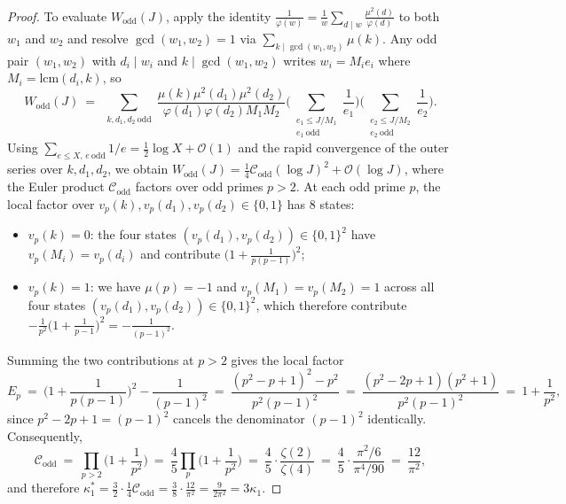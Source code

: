 \documentclass[11pt, a4paper]{article}
\theoremstyle{plain}
\theoremstyle{definition}
\begin{document}
\begin{proof}
To evaluate $W_{\mathrm{odd}}(J)$, apply the identity $\frac{1}{\varphi(w)}=\frac{1}{w}\sum_{d\mid w}\frac{\mu^{2}(d)}{\varphi(d)}$ to both $w_1$ and $w_2$ and resolve $\gcd(w_1,w_2)=1$ via $\sum_{k\mid\gcd(w_1,w_2)}\mu(k)$. Any odd pair $(w_1,w_2)$ with $d_i\mid w_i$ and $k\mid\gcd(w_1,w_2)$ writes $w_i=M_i e_i$ where $M_i=\mathrm{lcm}(d_i,k)$, so
$$W_{\mathrm{odd}}(J)\ =\ \sum_{\substack{k,d_1,d_2\ \mathrm{odd}}}\frac{\mu(k)\mu^{2}(d_1)\mu^{2}(d_2)}{\varphi(d_1)\varphi(d_2)M_1 M_2}\Big(\sum_{\substack{e_1\le J/M_1\\ e_1\ \mathrm{odd}}}\frac{1}{e_1}\Big)\Big(\sum_{\substack{e_2\le J/M_2\\ e_2\ \mathrm{odd}}}\frac{1}{e_2}\Big).$$
Using $\sum_{e\le X,\,e\ \mathrm{odd}}1/e=\frac12\log X+\mathcal{O}(1)$ and the rapid convergence of the outer series over $k,d_1,d_2$, we obtain $W_{\mathrm{odd}}(J)=\frac14\mathcal{C}_{\mathrm{odd}}(\log J)^{2}+\mathcal{O}(\log J)$, where the Euler product $\mathcal{C}_{\mathrm{odd}}$ factors over odd primes $p>2$. At each odd prime $p$, the local factor over $v_p(k),v_p(d_1),v_p(d_2)\in\{0,1\}$ has $8$ states:
\begin{itemize}
    \item $v_p(k)=0$: the four states $(v_p(d_1),v_p(d_2))\in\{0,1\}^{2}$ have $v_p(M_i)=v_p(d_i)$ and contribute $\big(1+\frac{1}{p(p-1)}\big)^{2}$;
    \item $v_p(k)=1$: we have $\mu(p)=-1$ and $v_p(M_1)=v_p(M_2)=1$ across all four states $(v_p(d_1),v_p(d_2))\in\{0,1\}^{2}$, which therefore contribute $-\frac{1}{p^{2}}\big(1+\frac{1}{p-1}\big)^{2}=-\frac{1}{(p-1)^{2}}$.
\end{itemize}
Summing the two contributions at $p>2$ gives the local factor
$$E_p\ =\ \Big(1+\frac{1}{p(p-1)}\Big)^{2}-\frac{1}{(p-1)^{2}}\ =\ \frac{(p^{2}-p+1)^{2}-p^{2}}{p^{2}(p-1)^{2}}\ =\ \frac{(p^{2}-2p+1)(p^{2}+1)}{p^{2}(p-1)^{2}}\ =\ 1+\frac{1}{p^{2}},$$
since $p^{2}-2p+1=(p-1)^{2}$ cancels the denominator $(p-1)^{2}$ identically. Consequently,
$$\mathcal{C}_{\mathrm{odd}}\ =\ \prod_{p>2}\Big(1+\frac{1}{p^{2}}\Big)\ =\ \frac{4}{5}\prod_{p}\Big(1+\frac{1}{p^{2}}\Big)\ =\ \frac{4}{5}\cdot\frac{\zeta(2)}{\zeta(4)}\ =\ \frac{4}{5}\cdot\frac{\pi^{2}/6}{\pi^{4}/90}\ =\ \frac{12}{\pi^{2}},$$
and therefore $\kappa_1^{\ast}=\frac32\cdot\frac14\mathcal{C}_{\mathrm{odd}}=\frac38\cdot\frac{12}{\pi^{2}}=\frac{9}{2\pi^{2}}=3\kappa_1$.
\end{proof}
\end{document}
